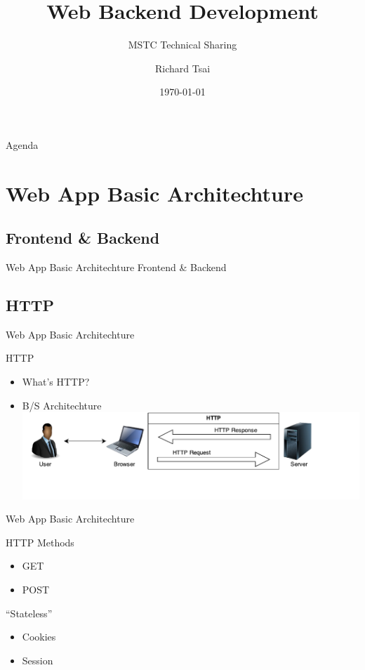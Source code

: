 \documentclass{beamer}
\title{Web Backend Development}
\subtitle{MSTC Technical Sharing}
\author{Richard Tsai}
\institute{Microsoft Student Technology Club,\\Sun Yat-sen University}
\date{\today}
\begin{document}
\begin{frame}[plain]
    \titlepage
\end{frame}

\begin{frame}{Agenda}
    \tableofcontents
\end{frame}

\section{Web App Basic Architechture}

\subsection{Frontend \& Backend}
\begin{frame}{Web App Basic Architechture}
    \center\Huge
    Frontend \& Backend
\end{frame}

\subsection{HTTP}
\begin{frame}{Web App Basic Architechture}
    \begin{block}{HTTP}
        \begin{itemize}
            \item What's HTTP? \pause
            \item B/S Architechture
                \includegraphics[scale=0.48]{http}
        \end{itemize}
    \end{block}
\end{frame}

\begin{frame}{Web App Basic Architechture}
    \begin{block}{HTTP Methods}
        \begin{itemize}
            \item GET
            \item POST
        \end{itemize}
    \end{block}
    \pause
    \begin{block}{``Stateless''}
        \begin{itemize}
            \item Cookies
            \item Session
        \end{itemize}
    \end{block}
\end{frame}
\end{document}
